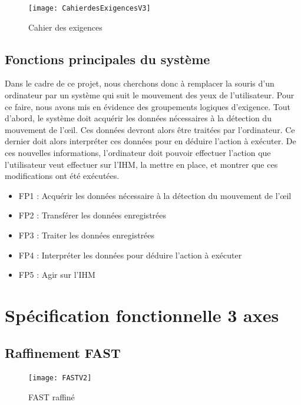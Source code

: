 \begin{figure}[H]
  \centering
  \texttt{[image: CahierdesExigencesV3]}
  \caption{Cahier des exigences}
  \label{fig:exigences}
\end{figure}

\subsection{Fonctions principales du système}

Dans le cadre de ce projet, nous cherchons donc à remplacer la souris d'un ordinateur par un système qui suit le mouvement des yeux de l'utilisateur. Pour ce faire, nous avons mis en évidence des groupements logiques d'exigence. Tout d'abord, le système doit acquérir les données nécessaires à la détection du mouvement de l'œil. Ces données devront alors être traitées par l'ordinateur. Ce dernier doit alors interpréter ces données pour en déduire l'action à exécuter. De ces nouvelles informations, l'ordinateur doit pouvoir effectuer l'action que l'utilisateur veut effectuer sur l'IHM, la mettre en place, et montrer que ces modifications ont été exécutées. 

\begin{itemize}[label=\textbullet,font=\color{black}]
\item FP1 : Acquérir les données nécessaire à la détection du mouvement de l'œil 
\item\colorbox{sable}{FP2 : Transférer les données enregistrées}
\item FP3 : Traiter les données enregistrées 
\item FP4 : Interpréter les données pour déduire l'action à exécuter 
\item FP5 : Agir sur l'IHM 
\end{itemize}

\section{Spécification fonctionnelle  3 axes}

\subsection{Raffinement FAST}

\begin{figure}[H]
  \centering
  \texttt{[image: FASTV2]}
  \caption{FAST raffiné}
  \label{fig:FAST}
\end{figure}

